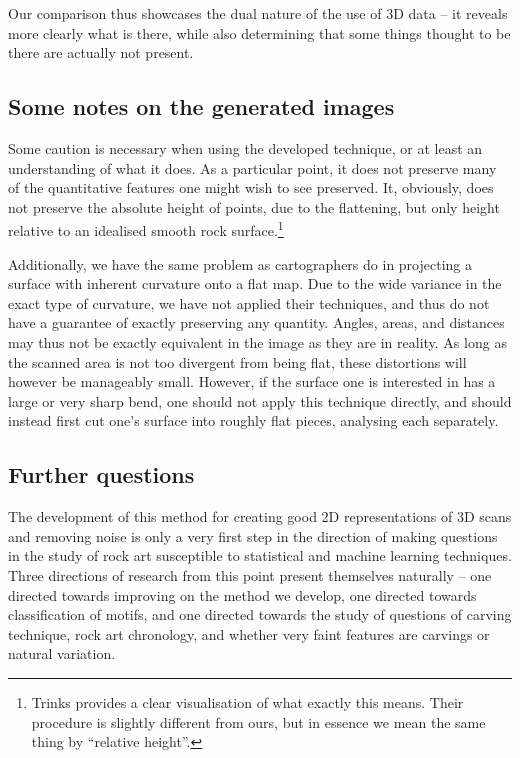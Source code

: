 \documentclass[a4paper,reqno,oneside]{amsart} %
\theoremstyle{definition}
\theoremstyle{remark}
\numberwithin{equation}{section}
\begin{document}
Our comparison thus showcases the dual nature of the use of 3D data -- it reveals more clearly what is there, while also determining that some things thought to be there are actually not present.

\subsection{Some notes on the generated images} Some caution is necessary when using the developed technique, or at least an understanding of what it does. As a particular point, it does not preserve many of the quantitative features one might wish to see preserved. It, obviously, does not preserve the absolute height of points, due to the flattening, but only height relative to an idealised smooth rock surface.\footnote{Trinks\cite{trinks} provides a clear visualisation of what exactly this means. Their procedure is slightly different from ours, but in essence we mean the same thing by ``relative height''.} 

Additionally, we have the same problem as cartographers do in projecting a surface with inherent curvature onto a flat map. Due to the wide variance in the exact type of curvature, we have not applied their techniques, and thus do not have a guarantee of exactly preserving any quantity. Angles, areas, and distances may thus not be exactly equivalent in the image as they are in reality. As long as the scanned area is not too divergent from being flat, these distortions will however be manageably small. However, if the surface one is interested in has a large or very sharp bend, one should not apply this technique directly, and should instead first cut one's surface into roughly flat pieces, analysing each separately.

\subsection{Further questions}

The development of this method for creating good 2D representations of 3D scans and removing noise is only a very first step in the direction of making questions in the study of rock art susceptible to statistical and machine learning techniques. Three directions of research from this point present themselves naturally -- one directed towards improving on the method we develop, one directed towards classification of motifs, and one directed towards the study of questions of carving technique, rock art chronology, and whether very faint features are carvings or natural variation.
\end{document}
